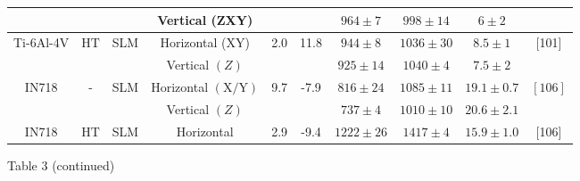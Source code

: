 \documentclass[10pt]{article}
\begin{document}
\begin{center}
\begin{tabular}{|c|c|c|c|c|c|c|c|c|c|}
\hline
 &  &  & Vertical (ZXY) &  &  & $964 \pm 7$ & $998 \pm 14$ & $6 \pm 2$ &  \\
\hline
Ti-6Al-4V & $\mathrm{HT}$ & SLM & Horizontal (XY) & 2.0 & 11.8 & $944 \pm 8$ & $1036 \pm 30$ & $8.5 \pm 1$ & [101] \\
\hline
 &  &  & Vertical $(Z)$ &  &  & $925 \pm 14$ & $1040 \pm 4$ & $7.5 \pm 2$ &  \\
\hline
IN718 & - & SLM & Horizontal $(\mathrm{X} / \mathrm{Y})$ & 9.7 & -7.9 & $816 \pm 24$ & $1085 \pm 11$ & $19.1 \pm 0.7$ & $[106]$ \\
\hline
 &  &  & Vertical $(Z)$ &  &  & $737 \pm 4$ & $1010 \pm 10$ & $20.6 \pm 2.1$ &  \\
\hline
IN718 & $\mathrm{HT}$ & SLM & Horizontal & 2.9 & -9.4 & $1222 \pm 26$ & $1417 \pm 4$ & $15.9 \pm 1.0$ & [106] \\
\hline
\end{tabular}
\end{center}

Table 3 (continued)
\end{document}

